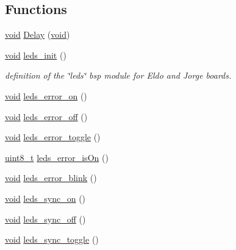 \subsection*{Functions}
\begin{DoxyCompactItemize}
\item 
\hyperlink{usb__devapi_8h_afabf60e7f57651d6d595a02c75f07cd0}{void} \hyperlink{iot-lab___a8-_m3_2leds_8c_a50fc5352e9082c30aa33a10ce5d9e409}{Delay} (\hyperlink{usb__devapi_8h_afabf60e7f57651d6d595a02c75f07cd0}{void})
\item 
\hyperlink{usb__devapi_8h_afabf60e7f57651d6d595a02c75f07cd0}{void} \hyperlink{group__leds_ga67cfc3137a465e560792490e81365254}{leds\+\_\+init} ()
\begin{DoxyCompactList}\small\item\em definition of the \char`\"{}leds\char`\"{} bsp module for Eldo and Jorge boards. \end{DoxyCompactList}\item 
\hyperlink{usb__devapi_8h_afabf60e7f57651d6d595a02c75f07cd0}{void} \hyperlink{group__leds_ga248d93c2ed295c1c463984b881e1b9af}{leds\+\_\+error\+\_\+on} ()
\item 
\hyperlink{usb__devapi_8h_afabf60e7f57651d6d595a02c75f07cd0}{void} \hyperlink{group__leds_ga4639337fca09b91f2136c2843a19e1b3}{leds\+\_\+error\+\_\+off} ()
\item 
\hyperlink{usb__devapi_8h_afabf60e7f57651d6d595a02c75f07cd0}{void} \hyperlink{group__leds_gaa0f84f5b86315c3eed24fc48a826f991}{leds\+\_\+error\+\_\+toggle} ()
\item 
\hyperlink{_p_e___types_8h_aba7bc1797add20fe3efdf37ced1182c5}{uint8\+\_\+t} \hyperlink{group__leds_ga49f878b007c160726b61f01fa6afce85}{leds\+\_\+error\+\_\+is\+On} ()
\item 
\hyperlink{usb__devapi_8h_afabf60e7f57651d6d595a02c75f07cd0}{void} \hyperlink{group__leds_gab68d0db5256aabc4415415f1b33acab5}{leds\+\_\+error\+\_\+blink} ()
\item 
\hyperlink{usb__devapi_8h_afabf60e7f57651d6d595a02c75f07cd0}{void} \hyperlink{group__leds_gaf1a59644fa7758343d6666e18a4c484c}{leds\+\_\+sync\+\_\+on} ()
\item 
\hyperlink{usb__devapi_8h_afabf60e7f57651d6d595a02c75f07cd0}{void} \hyperlink{group__leds_gafe7544b92ce4fb0eccb46179741ac32b}{leds\+\_\+sync\+\_\+off} ()
\item 
\hyperlink{usb__devapi_8h_afabf60e7f57651d6d595a02c75f07cd0}{void} \hyperlink{group__leds_ga5f8c9297538313c763dfe6cdd5ed8573}{leds\+\_\+sync\+\_\+toggle} ()
\item 

\end{DoxyCompactItemize}
